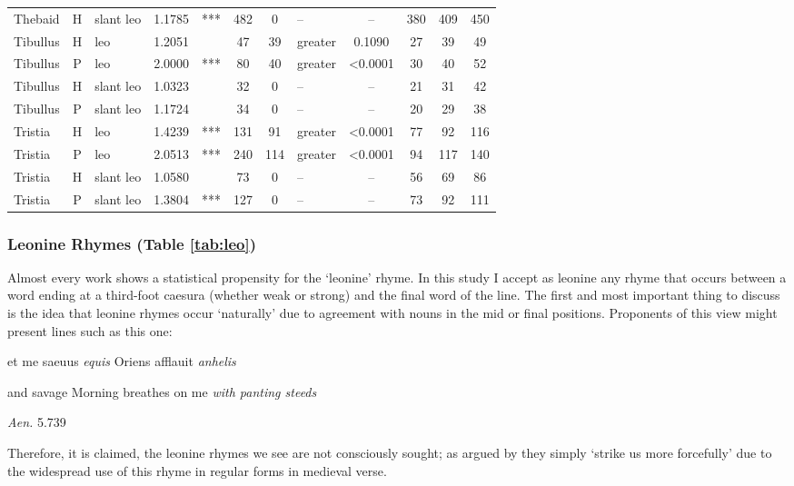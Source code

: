 \documentclass[twocolumn, switch, a4paper]{article} %
\begin{document}
\begin{table}[h!]
\begin{adjustbox}{totalheight=0.9\textheight}
\begin{tabular}{lclcccclcc@{\hspace{1\tabcolsep}}c@{\hspace{1\tabcolsep}}c}
       Thebaid &     H &  slant leo & 1.1785 &   *** &  482 &         0 &        -- & -- &  380 &  409 &  450 \\
      Tibullus &     H &        leo & 1.2051 &       &   47 &        39 &     greater & 0.1090 &   27 &   39 &   49 \\
      Tibullus &     P &        leo & 2.0000 &   *** &   80 &        40 &     greater & <0.0001 &   30 &   40 &   52 \\
      Tibullus &     H &  slant leo & 1.0323 &       &   32 &         0 &        -- & -- &   21 &   31 &   42 \\
      Tibullus &     P &  slant leo & 1.1724 &       &   34 &         0 &        -- & -- &   20 &   29 &   38 \\
       Tristia &     H &        leo & 1.4239 &   *** &  131 &        91 &     greater & <0.0001 &   77 &   92 &  116 \\
       Tristia &     P &        leo & 2.0513 &   *** &  240 &       114 &     greater & <0.0001 &   94 &  117 &  140 \\
       Tristia &     H &  slant leo & 1.0580 &       &   73 &         0 &        -- & -- &   56 &   69 &   86 \\
       Tristia &     P &  slant leo & 1.3804 &   *** &  127 &         0 &        -- & -- &   73 &   92 &  111 \\
  \bottomrule
  \end{tabular}
\end{adjustbox}
\end{table}

\subsubsection{Leonine Rhymes (Table \ref{tab:leo})}
\label{sec:leo}

Almost every work shows a statistical propensity for the `leonine' rhyme. In
this study I accept as leonine any rhyme that occurs between a word ending at
a third-foot caesura (whether weak or strong) and the final word of the line.
The first and most important thing to discuss is the idea that leonine rhymes
occur `naturally' due to agreement with nouns in the mid or final positions.
Proponents of this view might present lines such as this one:
\begin{adjustwidth}{0.5cm}{0.5cm}
  et me saeuus \emph{equis} Oriens afflauit \emph{anhelis}

  \noindent and savage Morning breathes on me \emph{with panting steeds}
  \begin{flushright}
    \emph{Aen.} 5.739
  \end{flushright}
\end{adjustwidth}
Therefore, it is claimed, the leonine rhymes we see are not consciously
sought; as argued by  they simply `strike us
more forcefully' due to the widespread use of this rhyme in regular forms in
medieval verse. 
\end{document}
